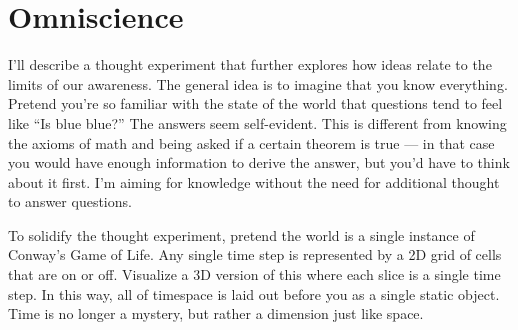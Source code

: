 \documentclass[9pt, twoside]{book}
\theoremstyle{argtstyle}
\begin{document}
%

\section{Omniscience}

I'll describe a thought experiment that further explores
how ideas relate to the limits of our awareness.
The general idea is to imagine that you know everything.
Pretend
you're so familiar with the state of the world that questions tend to
feel like ``Is blue blue?'' The answers seem self-evident.
This is
different from knowing the axioms of math and being asked if a certain theorem
is true --- in that case you would have enough information to derive the answer,
but you'd have to think about it first.
I'm aiming for knowledge without the need for additional thought to answer
questions.

To solidify the thought experiment, pretend the world is a single instance of
Conway's Game of Life. Any single time step is represented by a 2D grid of cells
that are on or off.
Visualize a 3D version of this where each slice is a single time step. In this
way, all of timespace is laid out before you as a single static object. Time is
no longer a mystery, but rather a dimension just like space.
\end{document}
